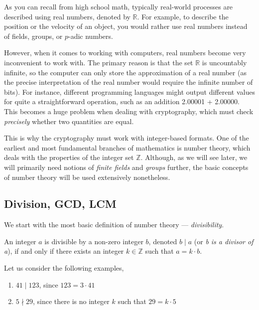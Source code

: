 \documentclass[../../book.tex]{subfiles}
\begin{document}
As you can recall from high school math, typically real-world processes are
described using real numbers, denoted by $\mathbb{R}$. For example, to describe
the position or the velocity of an object, you would rather use real numbers
instead of fields, groups, or $p$-adic numbers.

However, when it comes to working with computers, real numbers become very
inconvenient to work with. The primary reason is that the set $\mathbb{R}$ is
uncountably infinite, so the computer can only store the approximation of a real
number (as the precise interpretation of the real number would require the
infinite number of bits). For instance, different programming languages might
output different values for quite a straightforward operation, such as an
addition \textsf{2.00001 + 2.00000}. This becomes a huge problem when dealing
with cryptography, which must check \textit{precisely} whether two quantities
are equal.

This is why the cryptography must work with integer-based formats. One of the
earliest and most fundamental branches of mathematics is number theory, which
deals with the properties of the integer set $\mathbb{Z}$. Although, as we will
see later, we will primarily need notions of \emph{finite fields} and
\emph{groups} further, the basic concepts of number theory will be used
extensively nonetheless.

\subsection{Division, GCD, LCM}

We start with the most basic definition of number theory --- \emph{divisibility}.

\begin{definition}
    \label{def:divisibility}
    An integer $a$ is divisible by a non-zero integer $b$, denoted $b \mid a$ (or \emph{b is a divisor of a}), if and only if there exists an integer $k \in \mathbb{Z}$ such that $a = k \cdot b$.
\end{definition}

\begin{example} 
    \label{example:divisibility_1}
    Let us consider the following examples,
    \begin{enumerate}
        \item $41 \mid 123$, since $123 = 3 \cdot 41$
        \item $5 \nmid 29$, since there is no integer $k$ such that $29 = k \cdot 5$
    \end{enumerate}
\end{example}
\end{document}
